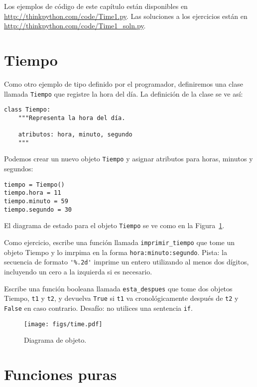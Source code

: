 \documentclass[10pt]{book}
\begin{document}
Los ejemplos de código de este capítulo están disponibles en
\url{http://thinkpython.com/code/Time1.py}.
Las soluciones a los ejercicios están en
\url{http://thinkpython.com/code/Time1_soln.py}.


\section{Tiempo}
\label{isafter}

Como otro ejemplo de tipo definido por el programador, definiremos una clase
llamada {\tt Tiempo} que registre la hora del día.  La definición de la clase
se ve así: 
  

\begin{verbatim}
class Tiempo:
    """Representa la hora del día.

    atributos: hora, minuto, segundo
    """
\end{verbatim}
%
Podemos crear un nuevo objeto {\tt Tiempo} y asignar
atributos para horas, minutos y segundos:

\begin{verbatim}
tiempo = Tiempo()
tiempo.hora = 11
tiempo.minuto = 59
tiempo.segundo = 30
\end{verbatim}
%
El diagrama de estado para el objeto {\tt Tiempo} se ve como en la Figura~\ref{fig.time}.

Como ejercicio, escribe una función llamada \verb"imprimir_tiempo" que tome un
objeto Tiempo y lo imrpima en la forma {\tt hora:minuto:segundo}.
Pista: la secuencia de formato \verb"'%.2d'" imprime un entero utilizando
al menos dos dígitos, incluyendo un cero a la izquierda si es necesario.

Escribe una función booleana llamada \verb"esta_despues" que
tome dos objetos Tiempo, {\tt t1} y {\tt t2}, y
devuelva {\tt True} si {\tt t1} va cronológicamente después de {\tt t2} y
{\tt False} en caso contrario.  Desafío: no utilices una sentencia {\tt if}.

\begin{figure}
\centerline
{\texttt{[image: figs/time.pdf]}}
\caption{Diagrama de objeto.}
\label{fig.time}
\end{figure}


\section{Funciones puras}
\end{document}
